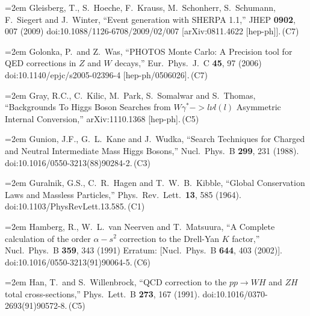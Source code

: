 \documentclass[letter,12pt]{article}
\def\xbibitem#1#2#3{\noindent\hangindent=2em #2\,(#3)}
\begin{document}
\xbibitem{Gleisberg:2008ta}{Gleisberg, T., S.~Hoeche, F.~Krauss, M.~Schonherr, S.~Schumann, F.~Siegert and J.~Winter,
  ``Event generation with SHERPA 1.1,''
  JHEP {\bf 0902}, 007 (2009)
  doi:10.1088/1126-6708/2009/02/007
  [arXiv:0811.4622 [hep-ph]].}{C7}

\xbibitem{Golonka:2005pn}{Golonka, P.\ and Z.~Was,
  ``PHOTOS Monte Carlo: A Precision tool for QED corrections in $Z$ and $W$ decays,''
  Eur.\ Phys.\ J.\ C {\bf 45}, 97 (2006)
  doi:10.1140/epjc/s2005-02396-4
  [hep-ph/0506026].}{C7}
  
\xbibitem{Gray:2011us}{Gray, R.C., C.~Kilic, M.~Park, S.~Somalwar and S.~Thomas,
  ``Backgrounds To Higgs Boson Searches from $W \gamma^* -> l \nu l (l)$ Asymmetric Internal Conversion,''
  arXiv:1110.1368 [hep-ph].}{C5}

\xbibitem{Gunion:1987ke}{Gunion, J.F., G.~L.~Kane and J.~Wudka,
  ``Search Techniques for Charged and Neutral Intermediate Mass Higgs Bosons,''
  Nucl.\ Phys.\ B {\bf 299}, 231 (1988).
  doi:10.1016/0550-3213(88)90284-2.}{C3}
    
\xbibitem{Guralnik:1964eu}{Guralnik, G.S., C.~R.~Hagen and T.~W.~B.~Kibble,
  ``Global Conservation Laws and Massless Particles,''
  Phys.\ Rev.\ Lett.\  {\bf 13}, 585 (1964).
  doi:10.1103/PhysRevLett.13.585.}{C1}


\xbibitem{Hamberg:1990np}{Hamberg, R., W.~L.~van Neerven and T.~Matsuura,
  ``A Complete calculation of the order $\alpha-s^{2}$ correction to the Drell-Yan $K$ factor,''
  Nucl.\ Phys.\ B {\bf 359}, 343 (1991)
  Erratum: [Nucl.\ Phys.\ B {\bf 644}, 403 (2002)].
  doi:10.1016/0550-3213(91)90064-5.}{C6}
  
\xbibitem{Han:1991ia}{Han, T.\ and S.~Willenbrock,
  ``QCD correction to the $pp\to WH$ and $ZH$  total cross-sections,''
  Phys.\ Lett.\ B {\bf 273}, 167 (1991).
  doi:10.1016/0370-2693(91)90572-8.}{C5}
\end{document}
